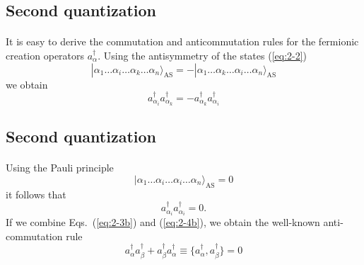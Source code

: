 \documentclass[%
twoside,                 %
final,                   %
10pt]{article}
\begin{document}
\subsection{Second quantization}

\paragraph{}
It is easy to derive the commutation and anticommutation rules  for the fermionic creation operators 
$a_\alpha^{\dagger}$. Using the antisymmetry of the states 
(\ref{eq:2-2})
\begin{equation}
	|\alpha_1\dots \alpha_i\dots \alpha_k\dots \alpha_n\rangle_{\mathrm{AS}} = 
		- |\alpha_1\dots \alpha_k\dots \alpha_i\dots \alpha_n\rangle_{\mathrm{AS}} \label{eq:2-3a}
\end{equation}
we obtain
\begin{equation}
	 a_{\alpha_i}^{\dagger}  a_{\alpha_k}^{\dagger} = - a_{\alpha_k}^{\dagger} a_{\alpha_i}^{\dagger} \label{eq:2-3b}
\end{equation}



\subsection{Second quantization}

\paragraph{}
Using the Pauli principle
\begin{equation}
	|\alpha_1\dots \alpha_i\dots \alpha_i\dots \alpha_n\rangle_{\mathrm{AS}} = 0 \label{eq:2-4a}
\end{equation}
it follows that
\begin{equation}
	a_{\alpha_i}^{\dagger}  a_{\alpha_i}^{\dagger} = 0. \label{eq:2-4b}
\end{equation}
If we combine Eqs.~(\ref{eq:2-3b}) and (\ref{eq:2-4b}), we obtain the well-known anti-commutation rule
\begin{equation}
	a_{\alpha}^{\dagger}  a_{\beta}^{\dagger} + a_{\beta}^{\dagger}  a_{\alpha}^{\dagger} \equiv 
		\{a_{\alpha}^{\dagger},a_{\beta}^{\dagger}\} = 0 \label{eq:2-5}
\end{equation}
\end{document}
